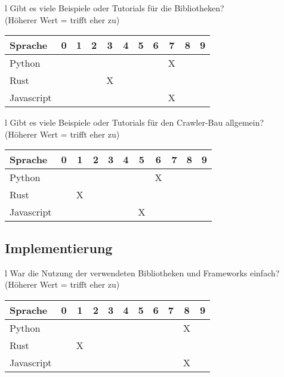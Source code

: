 \begin{tabular}{l}
	Gibt es viele Beispiele oder Tutorials für die Bibliotheken? \\
	(Höherer Wert = trifft eher zu)                              \\
	\begin{tabular}{| l | c | c | c | c | c | c | c | c | c | c |}
		\hline
		Sprache    & 0 & 1 & 2 & 3 & 4 & 5 & 6 & 7 & 8 & 9 \\
		\hline
		Python     &   &   &   &   &   &   &   & X &   &   \\
		\hline
		Rust       &   &   &   & X &   &   &   &   &   &   \\
		\hline
		Javascript &   &   &   &   &   &   &   & X &   &   \\
		\hline
	\end{tabular}
\end{tabular}

\begin{tabular}{l}
	Gibt es viele Beispiele oder Tutorials für den Crawler-Bau allgemein? \\
	(Höherer Wert = trifft eher zu)                                       \\
	\begin{tabular}{| l | c | c | c | c | c | c | c | c | c | c |}
		\hline
		Sprache    & 0 & 1 & 2 & 3 & 4 & 5 & 6 & 7 & 8 & 9 \\
		\hline
		Python     &   &   &   &   &   &   & X &   &   &   \\
		\hline
		Rust       &   & X &   &   &   &   &   &   &   &   \\
		\hline
		Javascript &   &   &   &   &   & X &   &   &   &   \\
		\hline
	\end{tabular}
\end{tabular}

\subsection{Implementierung}

\begin{tabular}{l}
	War die Nutzung der verwendeten Bibliotheken und Frameworks einfach? \\
	(Höherer Wert = trifft eher zu)                                      \\
	\begin{tabular}{| l | c | c | c | c | c | c | c | c | c | c |}
		\hline
		Sprache    & 0 & 1 & 2 & 3 & 4 & 5 & 6 & 7 & 8 & 9 \\
		\hline
		Python     &   &   &   &   &   &   &   &   & X &   \\
		\hline
		Rust       &   & X &   &   &   &   &   &   &   &   \\
		\hline
		Javascript &   &   &   &   &   &   &   &   & X &   \\
		\hline
	\end{tabular}
\end{tabular}

